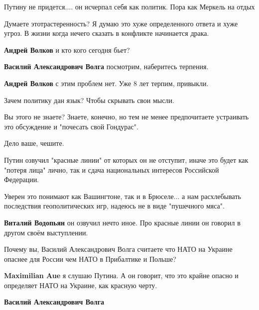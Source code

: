 \begin{itemize}
\begin{itemize}
\end{itemize} %

Путину не придется.... он исчерпал себя как политик. Пора как Меркель на отдых


Думаете этотрастеренность? Я думаю это хуже определенного ответа и хуже угроз.
В жизни когда нечего сказать в конфликте начинается драка.

\begin{itemize} %
\textbf{Андрей Волков} и кто кого сегодня бьет?

\textbf{Василий Александрович Волга} посмотрим, наберитесь терпения.

\textbf{Андрей Волков} с этим проблем нет. Уже 8 лет терпим, привыкли.
\end{itemize} %


Зачем политику дан язык? Чтобы скрывать свои мысли.

Вы этого не знаете? Знаете, конечно, но тем не менее предпочитаете устраивать это обсуждение и "почесать свой Гондурас".

Дело ваше, чешите.


Путин озвучил "красные линии" от которых он не отступит, иначе это будет как
"потеря лица" лично, так и сдача национальных интересов Российской Федерации.

Уверен это понимают как Вашингтоне, так и в Брюселе... а нам расхлебывать
последствия геополитических игр, надеюсь не в виде "пушечного мяса".

\begin{itemize} %
\textbf{Виталий Водопьян} он озвучил нечто иное. Про красные линии он говорил в другом своём выступлении.
\end{itemize} %

Почему вы, Василий Александрович Волга считаете что НАТО на Украине опаснее для России чем НАТО в Прибалтике и Польше?

\begin{itemize} %
\textbf{Maximilian Aue} я слушаю Путина. А он говорит, что это крайне опасно и определяет НАТО на Украине, как красную черту.

\textbf{Василий Александрович Волга} 


\end{itemize}
\end{itemize}

